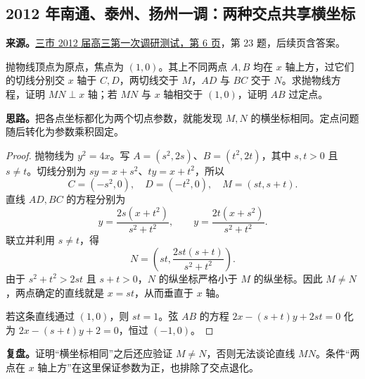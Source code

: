 \documentclass[UTF8,12pt,a4paper,fontset=fandol]{ctexart}
\begin{document}
\subsection{2012 年南通、泰州、扬州一调：两种交点共享横坐标}\label{sec:c2012nty1}
\textbf{来源。}\href{https://doc.xuehai.net/b8780209d98e4d302aafd63ce-6.html}{三市 2012 届高三第一次调研测试，第 6 页}，第 23 题，后续页含答案。
\begin{example}[题意]
抛物线顶点为原点，焦点为 $(1,0)$。其上不同两点 $A,B$ 均在 $x$ 轴上方，过它们的切线分别交 $x$ 轴于 $C,D$，两切线交于 $M$，$AD$ 与 $BC$ 交于 $N$。求抛物线方程，证明 $MN\perp x$ 轴；若 $MN$ 与 $x$ 轴相交于 $(1,0)$，证明 $AB$ 过定点。
\end{example}
\textbf{思路。}把各点坐标都化为两个切点参数，就能发现 $M,N$ 的横坐标相同。定点问题随后转化为参数乘积固定。
\begin{proof}
抛物线为 $y^2=4x$。写 $A=(s^2,2s)$、$B=(t^2,2t)$，其中 $s,t>0$ 且 $s\ne t$。切线分别为 $sy=x+s^2$、$ty=x+t^2$，所以
\[
C=(-s^2,0),\quad D=(-t^2,0),\quad M=(st,s+t).
\]
直线 $AD,BC$ 的方程分别为
\[
y=\frac{2s(x+t^2)}{s^2+t^2},\qquad
y=\frac{2t(x+s^2)}{s^2+t^2}.
\]
联立并利用 $s\ne t$，得
\[
N=\left(st,\frac{2st(s+t)}{s^2+t^2}\right).
\]
由于 $s^2+t^2>2st$ 且 $s+t>0$，$N$ 的纵坐标严格小于 $M$ 的纵坐标。因此 $M\ne N$，两点确定的直线就是 $x=st$，从而垂直于 $x$ 轴。

若这条直线通过 $(1,0)$，则 $st=1$。弦 $AB$ 的方程 $2x-(s+t)y+2st=0$ 化为 $2x-(s+t)y+2=0$，恒过 $(-1,0)$。
\end{proof}
\textbf{复盘。}证明“横坐标相同”之后还应验证 $M\ne N$，否则无法谈论直线 $MN$。条件“两点在 $x$ 轴上方”在这里保证参数为正，也排除了交点退化。
\end{document}
